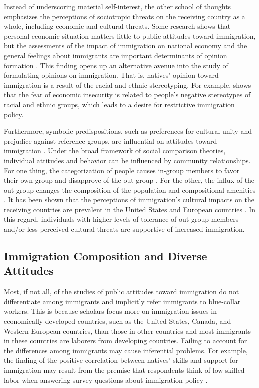 \documentclass[12pt]{article}
\begin{document}
Instead of underscoring material self-interest, the other school of thoughts emphasizes the perceptions of sociotropic threats on the receiving country as a whole, including economic and cultural threats. Some research shows that personal economic situation matters little to public attitudes toward immigration, but the assessments of the impact of immigration on national economy and the general feelings about immigrants are important determinants of opinion formation \citep{Citrinetal1997}. This finding opens up an alternative avenue into the study of formulating opinions on immigration. That is, natives' opinion toward immigration is a result of the racial and ethnic stereotyping. For example, \cite{BurnsGimpel2000} shows that the fear of economic insecurity is related to people's negative stereotypes of racial and ethnic groups, which leads to a desire for restrictive immigration policy. 


Furthermore, symbolic predispositions, such as preferences for cultural unity and prejudice against reference groups, are influential on attitudes toward immigration \citep[e.g.,][]{SidesCitrin2007}. Under the broad framework of social comparison theories, individual attitudes and behavior can be influenced by community relationships. For one thing, the categorization of people causes in-group members to favor their own group and disapprove of the out-group \citep{ChandlerTsai2001}. For the other, the influx of the out-group changes the composition of the population and compositional amenities \citep{Cardetal2012}. It has been shown that the perceptions of immigration's cultural impacts on the receiving countries are prevalent in the United States and European countries \citep{CitrinSides2008, HainmuellerHiscox2007}. In this regard, individuals with higher levels of tolerance of out-group members and/or less perceived cultural threats are supportive of increased immigration. 



\subsection{Immigration Composition and Diverse Attitudes}


Most, if not all, of the studies of public attitudes toward immigration do not differentiate among immigrants and implicitly refer immigrants to blue-collar workers. This is because scholars focus more on immigration issues in economically developed countries, such as the United States, Canada, and Western European countries, than those in other countries and most immigrants in these countries are laborers from developing countries. Failing to account for the differences among immigrants may cause inferential problems. For example, the finding of the positive correlation between natives' skills and support for immigration may result from the premise that respondents think of low-skilled labor when answering survey questions about immigration policy \citep{ScheveSlaughter2001}.
\end{document}
